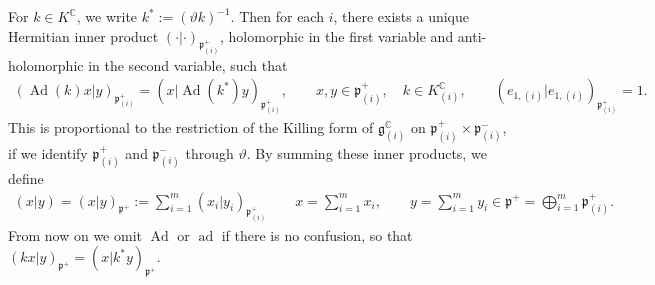 \documentclass[11pt]{article}
\numberwithin{equation}{section}
\newcommand{\BC}{\mathbb{C}}
\newcommand{\fg}{\mathfrak{g}}
\newcommand{\fp}{\mathfrak{p}}
\begin{document}
For $k\in K^\BC$, we write $k^*:=(\vartheta k)^{-1}$.
Then for each $i$, there exists a unique Hermitian inner product $(\cdot|\cdot)_{\fp^+_{(i)}}$,
holomorphic in the first variable and anti-holomorphic in the second variable, such that
\begin{gather*}
(\operatorname{Ad}(k)x|y)_{\fp^+_{(i)}} =(x|\operatorname{Ad}(k^*)y)_{\fp^+_{(i)}}, \qquad x,y\in\fp^+_{(i)},\quad k\in K^\BC_{(i)},\qquad
(e_{1,(i)}|e_{1,(i)})_{\fp^+_{(i)}} =1.
\end{gather*}
This is proportional to the restriction of the Killing form of $\fg_{(i)}^\BC$ on $\fp^+_{(i)}\times \fp^-_{(i)}$,
if we identify $\fp^+_{(i)}$ and $\fp^-_{(i)}$ through $\vartheta$. By summing these inner products, we define
\begin{gather}\label{innerprod}
(x|y)=(x|y)_{\fp^+}:=\sum_{i=1}^m (x_i|y_i)_{\fp^+_{(i)}} \qquad
 x=\sum_{i=1}^m x_i, \qquad y=\sum_{i=1}^m y_i\in\fp^+=\bigoplus_{i=1}^m\fp^+_{(i)} .
\end{gather}
From now on we omit $\operatorname{Ad}$ or $\operatorname{ad}$ if there is no confusion, so that $(kx|y)_{\fp^+}=(x|k^*y)_{\fp^+}$.
\end{document}
